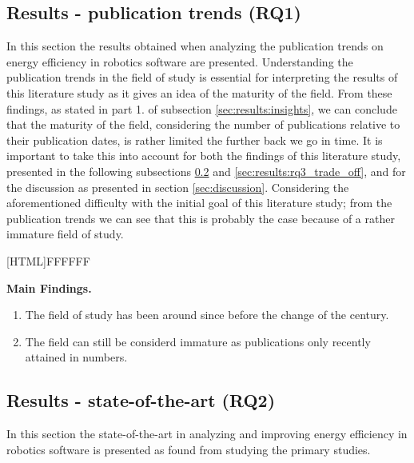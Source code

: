 \subsection{Results - publication trends (RQ1)}
\label{sec:results:rq1_pub_trends}

In this section the results obtained when analyzing the publication trends on energy efficiency in robotics software are presented.
Understanding the publication trends in the field of study is essential for interpreting the results of this literature study as it gives
an idea of the maturity of the field. From these findings, as stated in part 1. of subsection \ref{sec:results:insights}, we can conclude that the maturity of the field, considering the number of publications relative to their publication dates, 
is rather limited the further back we go in time. It is important to take this into account for both the findings of this literature study, presented in the following subsections 
\ref{sec:results:rq2_state_of_the_art} and \ref{sec:results:rq3_trade_off}, and for the discussion as presented in section \ref{sec:discussion}.
Considering the aforementioned difficulty with the initial goal of this literature study; from the publication trends we can see that this 
is probably the case because of a rather immature field of study.

\vspace{5mm}

\noindent{}[HTML]{FFFFFF}{\parbox{0.47\textwidth}{%
\noindent \textbf{Main Findings.}
\begin{enumerate}[nolistsep]
\item The field of study has been around since before the change of the century.
\item The field can still be considerd immature as publications only recently attained in numbers.
\end{enumerate}}}

\newpage

\subsection{Results - state-of-the-art (RQ2)}
\label{sec:results:rq2_state_of_the_art}
In this section the state-of-the-art in analyzing and improving energy efficiency in robotics software is presented as found from studying the primary studies.

